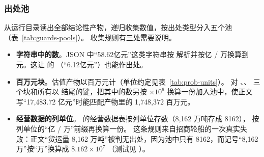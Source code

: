 \subsubsection{出处池}

 从运行目录读出全部结论性产物，递归收集数值，按出处类型分入五个池（表~\ref{tab:guards-pools}）。
收集规则有三处需要说明。
\begin{itemize}
\item \textbf{字符串中的数}。JSON 中“58.62亿元”这类字符串按  解析并按亿 / 万换算到元。这让  的 
  （“6.12亿元”）也能作出处。
\item \textbf{百万元块}。估值产物以百万元计（单位约定见表~\ref{tab:prob-units}）。 对 、、
  三个块和所有以  结尾的键，把其中的数另按 $\times10^6$ 换算一份加入池中，使正文写“17,483.72 亿元”时能匹配产物里的 1,748,372 百万元。
\item \textbf{经营数据的列单位}。 的经营数据表按列单位存数（8,162 万吨存成 8162）， 按列单位的“亿 / 万”前缀再换算一份。
  这条规则来自招商轮船的一次真实失败：正文“货运量 8,162 万吨”被判无出处，因为池中只有 8162，而记号“8,162万”按“万”换算成 $8.162\times10^7$
  （测试见 ）。
\end{itemize}

